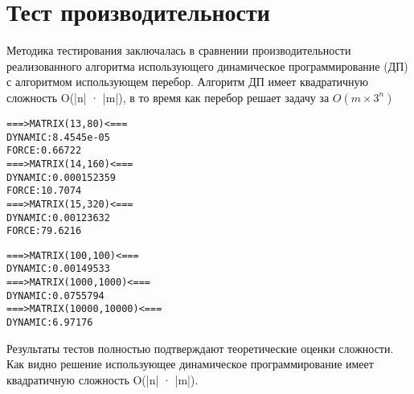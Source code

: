 \section{Тест производительности}
Методика тестирования заключалась в сравнении производительности реализованного алгоритма использующего
динамическое программирование (ДП) с алгоритмом использующем перебор. Алгоритм ДП имеет квадратичную сложность O(|n| · |m|), в то время как перебор решает задачу за
$O(m \times 3^n)$

\begin{alltt}
===>   MATRIX (13,80)   <===
DYNAMIC: 8.4545e-05
FORCE: 0.66722
===>   MATRIX (14,160)   <===
DYNAMIC: 0.000152359
FORCE: 10.7074
===>   MATRIX (15,320)   <===
DYNAMIC: 0.00123632
FORCE: 79.6216

===>   MATRIX (100,100)   <===
DYNAMIC: 0.00149533
===>   MATRIX (1000,1000)   <===
DYNAMIC: 0.0755794
===>   MATRIX (10000,10000)   <===
DYNAMIC: 6.97176

\end{alltt}
Результаты тестов полностью подтверждают теоретические оценки сложности. Как видно решение использующее динамическое программирование имеет квадратичную сложность O(|n| · |m|).
\pagebreak

